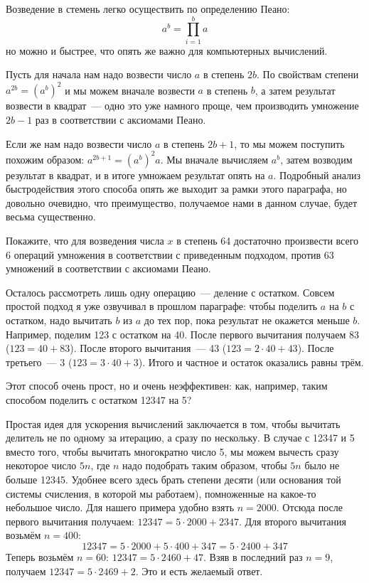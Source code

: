 Возведение в стемень легко осуществить по определению Пеано:
$$a^b = \prod_{i=1}^b a$$
но можно и быстрее, что опять же важно для компьютерных вычислений.

Пусть для начала нам надо возвести число $a$ в степень $2b$. По свойствам степени $a^{2b} = (a^b)^2$ и мы можем вначале возвести $a$ в степень $b$, а затем результат возвести в квадрат~--- одно это уже намного проще, чем производить умножение $2b - 1$ раз в соответствии с аксиомами Пеано.

Если же нам надо возвести число $a$ в степень $2b +1$, то мы можем поступить похожим образом: $a^{2b+1} = (a^b)^2a$. Мы вначале вычисляем $a^b$, затем возводим результат в квадрат, и в итоге умножаем результат опять на $a$. Подробный анализ быстродействия этого способа опять же выходит за рамки этого параграфа, но довольно очевидно, что преимущество, получаемое нами в данном случае, будет весьма существенно.
\begin{exercise}
Покажите, что для возведения числа $x$ в степень 64 достаточно произвести всего 6 операций умножения в соответствии с приведенным подходом, против 63 умножений в соответствии с аксиомами Пеано.
\end{exercise}

Осталось рассмотреть лишь одну операцию~--- деление с остатком. Совсем простой подход я уже озвучивал в прошлом параграфе: чтобы поделить $a$ на $b$ с остатком, надо вычитать $b$ из $a$ до тех пор, пока результат не окажется меньше $b$. Например, поделим 123 с остатком на 40. После первого вычитания получаем 83 ($123 = 40 + 83$). После второго вычитания~--- 43 ($123 = 2\cdot 40 + 43$). После третьего~--- 3 ($123 = 3\cdot 40 + 3$). Итого и частное и остаток оказались равны трём.

Этот способ очень прост, но и очень неэффективен: как, например, таким способом поделить с остатком 12347 на 5?

Простая идея для ускорения вычислений заключается в том, чтобы вычитать делитель не по одному за итерацию, а сразу по нескольку. В случае с 12347 и 5 вместо того, чтобы вычитать многократно число 5, мы можем вычесть сразу некоторое число $5n$, где $n$ надо подобрать таким образом, чтобы $5n$ было не больше 12345. Удобнее всего здесь брать степени десяти (или основания той системы счисления, в которой мы работаем), помноженные на какое-то небольшое число. Для нашего примера удобно взять $n=2000$. Отсюда после первого вычитания получаем: $12347 = 5\cdot 2000 + 2347$. Для второго вычитания возьмём $n=400$:
$$12347 = 5\cdot 2000 + 5\cdot 400 + 347 = 5\cdot 2400 + 347$$
Теперь возьмём $n=60$: $12347 = 5\cdot 2460 + 47$. Взяв в последний раз $n=9$, получаем $12347 = 5\cdot 2469 + 2$. Это и есть желаемый ответ.

